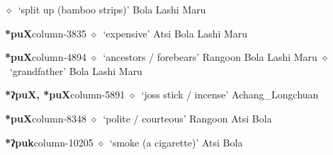          $\diamond$~`split up (bamboo strips)'
         Bola 
\hspace{1ex}
         Lashi 
\hspace{1ex}
         Maru 
  \item {\footnotesize \textbf{*puX}}{\tiny column-3835}
         $\diamond$~`expensive'
         Atsi 
\hspace{1ex}
         Bola 
\hspace{1ex}
         Lashi 
\hspace{1ex}
         Maru 
  \item {\footnotesize \textbf{*puX}}{\tiny column-4894}
         $\diamond$~`ancestors / forebears'
         Rangoon 
\hspace{1ex}
         Bola 
\hspace{1ex}
         Lashi 
\hspace{1ex}
         Maru 
\hspace{1ex}
         $\diamond$~`grandfather'
         Bola 
\hspace{1ex}
         Lashi 
\hspace{1ex}
         Maru 
  \item {\footnotesize \textbf{*ʔpuX, *puX}}{\tiny column-5891}
         $\diamond$~`joss stick / incense'
         Achang\_Longchuan 
  \item {\footnotesize \textbf{*puX}}{\tiny column-8348}
         $\diamond$~`polite / courteous'
         Rangoon 
\hspace{1ex}
         Atsi 
\hspace{1ex}
         Bola 
  \item {\footnotesize \textbf{*ʔpuk}}{\tiny column-10205}
         $\diamond$~`smoke (a cigarette)'
         Atsi 
\hspace{1ex}
         Bola 
\hspace{1ex}
